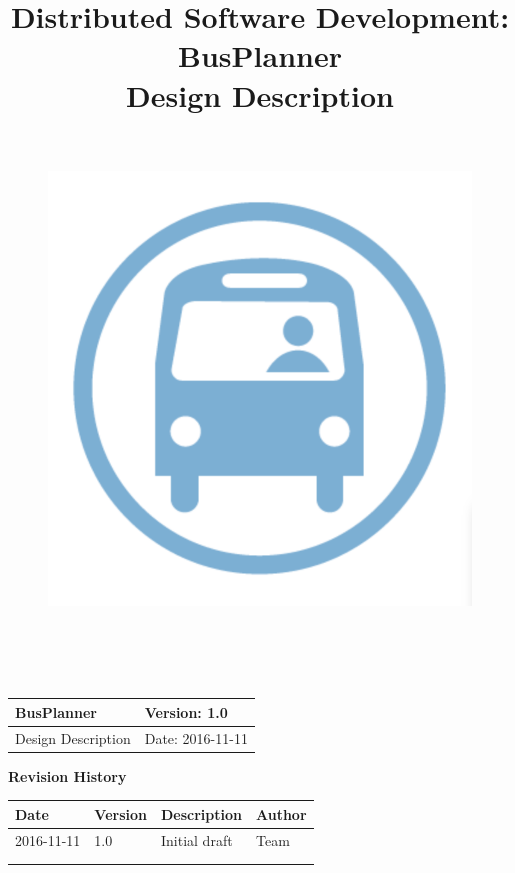 \documentclass[a4paper, 12pt]{article}
\title{
	\textbf{D}istributed \textbf{S}oftware \textbf{D}evelopment: \textbf{BusPlanner}\\
	\textbf{Design Description}\\
	\begin{figure}[H]
		\centering
		\includegraphics[width=13cm, height=13cm]{Bus_logo}
	\end{figure}
	\date{}
}
\begin{document}
	\begin{table}[t]
		\centering
		\begin{tabular}{| m{6cm} | m{6cm} |}
			\hline
			BusPlanner & Version: 1.0\\
			\hline
			Design Description & Date: 2016-11-11\\
			\hline
		\end{tabular}
	\end{table}
	\maketitle 
	\begin{center}
		\textbf{\Large Revision History}
	\end{center}
	\begin{table}[h]
		\centering
		\begin{tabular}{| m{3cm} | m{3cm} | m{3cm} | m{3cm} |}
			\hline
			\textbf{Date} & \textbf{Version} & \textbf{Description} & \textbf{Author}\\
			\hline
			2016-11-11 & 1.0 & Initial draft & Team\\
			\hline
			&&&\\
			\hline
			&&&\\
			\hline
		\end{tabular}
	\end{table}
\newpage
	\tableofcontents
	
	
	
	
	
	
\end{document}
